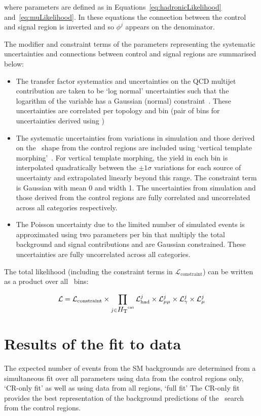 where parameters are defined as in Equations~\ref{eq:hadronicLikelihood} and~\ref{eq:muLikelihood}. 
In these equations the connection between the control and signal region is inverted
and so $\phi^{j}$ appears on the denominator. 

The modifier and constraint terms of the parameters representing the systematic uncertainties and 
connections between control and signal regions are summarised below:

\begin{itemize}
\item The transfer factor systematics and uncertainties on the QCD multijet contribution 
are taken to be `log normal' uncertainties such that the logarithm of the variable has 
a Gaussian (normal) constraint~\cite{templateMorphing}. These uncertainties are correlated per topology and \scalht bin 
(pair of \scalht bins for uncertainties derived using \mmj)
\item The systematic uncertainties from variations in simulation and those derived on the \mht~shape from the control regions 
are included using `vertical template morphing'~\cite{templateMorphing}. For vertical template morphing, the yield
in each bin is interpolated quadratically between the $\pm 1\sigma$ variations for each source of
uncertainty and extrapolated linearly beyond this range. The constraint term is Gaussian
with mean 0 and width 1. The uncertainties from simulation and those derived from the control regions
are fully correlated and uncorrelated across all categories respectively.
\item The Poisson uncertainty due to the limited number of simulated events is approximated using
two parameters per bin that multiply the total background and signal contributions and 
are Gaussian constrained. These uncertainties are fully uncorrelated across all categories.
\end{itemize}

The total likelihood (including the constraint terms in $\mathcal{L}_\mathrm{constraint}$) 
can be written as a product over all \htcat~bins:

\begin{equation}
\label{eq:totalLikelihood}
\mathcal{L} =  \mathcal{L}_\mathrm{constraint} \times \prod_{j\in\mbox{$H_\text{T}$}^{\text{cat}}} \mathcal{L}^{j}_{\mathrm{had}} \times \mathcal{L}^{j}_{\mathrm{\mu\mu}} 
\times \mathcal{L}^{j}_{\mathrm{\gamma}} \times \mathcal{L}^{j}_{\mathrm{\mu}}
\end{equation}


\section{Results of the fit to data}
\label{sec:results}
The expected number of events from the SM backgrounds are determined from 
a simultaneous fit over all parameters using data from the control regions only, `CR-only fit' 
as well as using data from all regions, `full fit'  The CR-only fit provides the 
best representation of the background predictions of the \alphat~search from the control regions.

